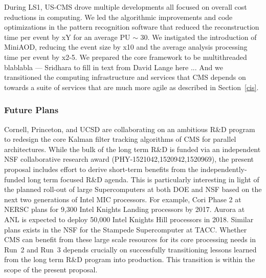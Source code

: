 \documentclass[11pt,a4paper]{article}
\begin{document}
During LS1, US-CMS drove multiple developments all focused on overall cost reductions in computing.
We led the algorithmic improvements and code optimizations in the pattern recognition software that reduced the reconstruction
time per event by xY for an average PU $\sim$ 30. We instigated the introduction of MiniAOD, reducing the event size by x10
and the average analysis processing time per event by x2-5.
We prepared the core framework to be multithreaded blablabla --- Sridhara to fill in text from David Lange here ... 
And we transitioned the computing infrastructure and services that CMS depends on towards a suite of services that are much 
more agile as described in Section~\ref{cis}.

\subsubsection{Future Plans}

 Cornell, Princeton, and UCSD are
collaborating on an ambitious R\&D program to redesign the core
Kalman filter tracking algorithms of CMS for parallel architectures.  While
the bulk of the long term R\&D is funded via an
independent NSF collaborative research award (PHY-1521042,1520942,1520969), the present proposal includes 
effort to derive short-term benefits from the
independently-funded long term focused R\&D agenda.  This is particularly
interesting in light of the planned roll-out of large Supercomputers at
both DOE and NSF based on the next two generations of Intel MIC
processors. For example, Cori Phase 2 at NERSC plans for 9,300 Intel
Knights Landing processors by 2017. Aurora at ANL is expected to deploy
50,000 Intel Knights Hill processors in 2018.  Similar plans exists in the
NSF for the Stampede Supercomputer at TACC.  Whether CMS can
benefit from these large scale resources for its core processing needs in
Run~2 and Run~3 depends crucially on successfully transitioning lessons
learned from the long term R\&D program into
production. This transition is within the scope of the present proposal.
\end{document}
